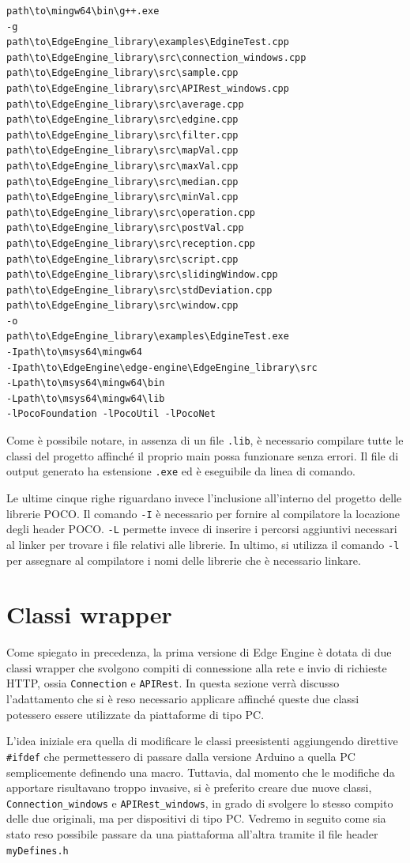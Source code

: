 \begin{verbatim}
path\to\mingw64\bin\g++.exe 
-g 
path\to\EdgeEngine_library\examples\EdgineTest.cpp
path\to\EdgeEngine_library\src\connection_windows.cpp
path\to\EdgeEngine_library\src\sample.cpp
path\to\EdgeEngine_library\src\APIRest_windows.cpp
path\to\EdgeEngine_library\src\average.cpp
path\to\EdgeEngine_library\src\edgine.cpp
path\to\EdgeEngine_library\src\filter.cpp
path\to\EdgeEngine_library\src\mapVal.cpp
path\to\EdgeEngine_library\src\maxVal.cpp
path\to\EdgeEngine_library\src\median.cpp
path\to\EdgeEngine_library\src\minVal.cpp
path\to\EdgeEngine_library\src\operation.cpp
path\to\EdgeEngine_library\src\postVal.cpp
path\to\EdgeEngine_library\src\reception.cpp
path\to\EdgeEngine_library\src\script.cpp
path\to\EdgeEngine_library\src\slidingWindow.cpp
path\to\EdgeEngine_library\src\stdDeviation.cpp
path\to\EdgeEngine_library\src\window.cpp
-o
path\to\EdgeEngine_library\examples\EdgineTest.exe
-Ipath\to\msys64\mingw64
-Ipath\to\EdgeEngine\edge-engine\EdgeEngine_library\src
-Lpath\to\msys64\mingw64\bin
-Lpath\to\msys64\mingw64\lib
-lPocoFoundation -lPocoUtil -lPocoNet
\end{verbatim}

Come è possibile notare, in assenza di un file \texttt{.lib}, è necessario compilare tutte le classi del progetto affinché il proprio main possa funzionare senza errori. Il file di output generato ha estensione \texttt{.exe} ed è eseguibile da linea di comando.

Le ultime cinque righe riguardano invece l'inclusione all'interno del progetto delle librerie POCO. Il comando \texttt{-I} è necessario per fornire al compilatore la locazione degli header POCO. \texttt{-L}  permette invece di inserire i percorsi aggiuntivi necessari al linker per trovare i file relativi alle librerie. In ultimo, si utilizza il comando \texttt{-l} per assegnare al compilatore i nomi delle librerie che è necessario linkare.  
\section{Classi wrapper}
Come spiegato in precedenza, la prima versione di Edge Engine è dotata di due classi wrapper che svolgono compiti di connessione alla rete e invio di richieste HTTP, ossia \texttt{Connection} e \texttt{APIRest}. In questa sezione verrà discusso l’adattamento che si è reso necessario applicare affinché queste due classi potessero essere utilizzate da piattaforme di tipo PC.

L’idea iniziale era quella di modificare le classi preesistenti aggiungendo direttive \texttt{\#ifdef} che permettessero di passare dalla versione Arduino a quella PC semplicemente definendo una macro. Tuttavia, dal momento che le modifiche da apportare risultavano troppo invasive, si è preferito creare due nuove classi, \texttt{Connection\_windows} e \texttt{APIRest\_windows}, in grado di svolgere lo stesso compito delle due originali, ma per dispositivi di tipo PC. Vedremo in seguito come sia stato reso possibile passare da una piattaforma all'altra tramite il file header \texttt{myDefines.h} 
